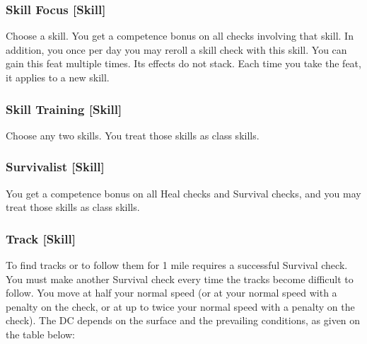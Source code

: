 \subsubsection{Skill Focus [Skill]}
Choose a skill.
 You get a  competence bonus on all checks involving that skill. In addition, you once per day you may reroll a skill check with this skill.
 You can gain this feat multiple times. Its effects do not stack. Each time you take the feat, it applies to a new skill.

\subsubsection{Skill Training [Skill]}
\featben Choose any two skills. You treat those skills as class skills.

\subsubsection{Survivalist [Skill]}
 You get a  competence bonus on all Heal checks and Survival checks, and you may treat those skills as class skills.

\subsubsection{Track [Skill]}
 To find tracks or to follow them for 1 mile requires a successful Survival check. You must make another Survival check every time the tracks become difficult to follow.
You move at half your normal speed (or at your normal speed with a  penalty on the check, or at up to twice your normal speed with a  penalty on the check). The DC depends on the surface and the prevailing conditions, as given on the table below:

